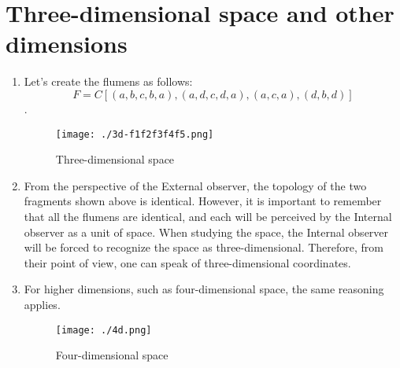 \documentclass[final]{article}
\begin{document}
    \section{Three-dimensional space and other dimensions}
        \begin{enumerate}
            \item Let's create the flumens as follows: \[ F =
            C[(a,b,c,b,a), (a,d,c,d,a), (a,c,a), (d,b,d)] \].

            \begin{figure}[H]
                \centering
                \texttt{[image: ./3d-f1f2f3f4f5.png]}
                \caption{Three-dimensional space}
                \label{fig:image}
            \end{figure}

            \item From the perspective of the External observer, the topology of 
            the two fragments shown above is identical. However, it is important 
            to remember that all the flumens are identical, and each will be 
            perceived by the Internal observer as a unit of space. When studying 
            the space, the Internal observer will be forced to recognize the 
            space as three-dimensional. Therefore, from their point of view, one 
            can speak of three-dimensional coordinates.

            \item For higher dimensions, such as four-dimensional space, the 
            same reasoning applies.

            \begin{figure}[H]
                \centering
                \texttt{[image: ./4d.png]}
                \caption{Four-dimensional space}
                \label{fig:image}
            \end{figure}

        \end{enumerate}
\end{document}
